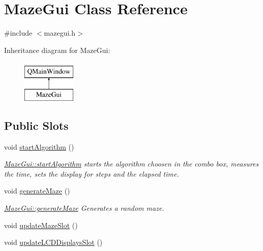 \hypertarget{class_maze_gui}{\section{Maze\-Gui Class Reference}
\label{class_maze_gui}
}


{\ttfamily \#include $<$mazegui.\-h$>$}

Inheritance diagram for Maze\-Gui\-:\begin{figure}[H]
\begin{center}
\leavevmode
\includegraphics[height=2.000000cm]{class_maze_gui}
\end{center}
\end{figure}
\subsection*{Public Slots}
\begin{DoxyCompactItemize}
\item 
void \hyperlink{class_maze_gui_aa3b128bc77c97364bd0abcfab50facac}{start\-Algorithm} ()
\begin{DoxyCompactList}\small\item\em \hyperlink{class_maze_gui_aa3b128bc77c97364bd0abcfab50facac}{Maze\-Gui\-::start\-Algorithm} starts the algorithm choosen in the combo box, measures the time, sets the display for steps and the elapsed time. \end{DoxyCompactList}\item 
void \hyperlink{class_maze_gui_a951cf062b683fc7b9e35f5e655b0f609}{generate\-Maze} ()
\begin{DoxyCompactList}\small\item\em \hyperlink{class_maze_gui_a951cf062b683fc7b9e35f5e655b0f609}{Maze\-Gui\-::generate\-Maze} Generates a random maze. \end{DoxyCompactList}\item 
void \hyperlink{class_maze_gui_ad16d7a5be838ffbde722bfdeb05859a4}{update\-Maze\-Slot} ()
\item 
void \hyperlink{class_maze_gui_a11530ab74ba41b8013ecacc25aca3363}{update\-L\-C\-D\-Displays\-Slot} ()
\end{DoxyCompactItemize}
